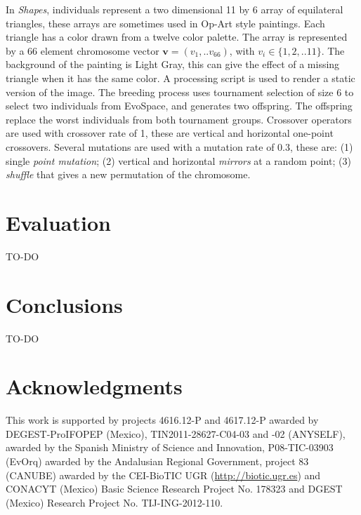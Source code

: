 \documentclass{sig-alternate}
\begin{document}
In \emph{Shapes}, individuals represent a two dimensional 11 by 6 array of equilateral triangles, these arrays are sometimes used in Op-Art style paintings.
Each triangle has a color drawn from a twelve color palette.
The array is represented by a 66 element chromosome vector $\mathbf{v}=(v_1,..v_{66})$, with $v_i \in \{ 1,2,..11 \}$.
The background of the painting is Light Gray, this can give the effect of a missing triangle when it has the same color.
A processing script is used to render a static version of the image.
The breeding process uses tournament selection of size 6 to select two individuals from EvoSpace,
and generates two offspring.
The offspring replace the worst individuals from both tournament groups.
Crossover operators are used with crossover rate of 1, these are vertical and horizontal one-point crossovers.
Several mutations are used with a mutation rate of 0.3, these are:
(1) single \emph{point mutation}; (2) vertical and horizontal \emph{mirrors} at a random point;
(3) \emph{shuffle} that gives a new permutation of the chromosome.

\section{Evaluation}
TO-DO
\section{Conclusions}
\label{sec:conclusions}
TO-DO


\section{Acknowledgments}
This work is supported by projects 4616.12-P and 4617.12-P awarded by DEGEST-ProIFOPEP (Mexico), TIN2011-28627-C04-03 and -02 (ANYSELF), awarded by the Spanish Ministry of Science and Innovation, P08-TIC-03903 (EvOrq) awarded by the Andalusian Regional Government, project 83 (CANUBE) awarded by the CEI-BioTIC UGR
(\url{http://biotic.ugr.es}) and CONACYT (Mexico) Basic Science Research Project No. 178323 and DGEST (Mexico) Research Project No. TIJ-ING-2012-110.

%

%
%
\end{document}
